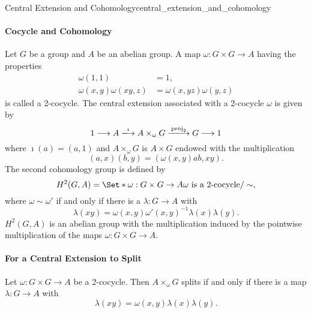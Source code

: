 \documentclass{article}
\begin{document}
\begin{example}{Central Extension and Cohomology}{central_extension_and_cohomology}
    \paragraph*{Cocycle and Cohomology}
    Let $G$ be a group and $A$ be an abelian group.
    A map $\omega: G\times G \rightarrow A$ having the properties
    \begin{align*}
        \omega(1,1) &= 1, \\
        \omega(x,y)\omega(xy,z) &= \omega(x,yz)\omega(y,z)
    \end{align*}
    is called a 2-cocycle.
    The central extension associated with a 2-cocycle $\omega$ is given by
    \[ 1 \longrightarrow A \xlongrightarrow{\imath} A \times_\omega G \xlongrightarrow{\operatorname{proj}_2} G \longrightarrow 1 \]
    where $\imath(a) = (a,1)$ and $A \times_\omega G$ is $A\times G$ endowed with the multiplication
    \[ (a,x)(b,y) = (\omega(x,y)ab, xy). \]
    The second cohomology group is defined by
    \[ H^2(G,A) = \Set*{\omega:G\times G \rightarrow A}{\omega \text{ is a 2-cocycle}}/\sim, \]
    where $\omega \sim \omega'$ if and only if there is a $\lambda:G\rightarrow A$ with
    \[ \lambda(xy) = \omega(x,y)\omega'(x,y)^{-1}\lambda(x)\lambda(y). \]
    $H^2(G,A)$ is an abelian group with the multiplication induced by the pointwise multiplication of the maps $\omega:G\times G \rightarrow A$.
    \paragraph*{For a Central Extension to Split}
    Let $\omega:G\times G\rightarrow A$ be a 2-cocycle.
    Then $A \times_\omega G$ splits if and only if there is a map $\lambda:G\rightarrow A$ with
    \[ \lambda(xy) = \omega(x,y)\lambda(x)\lambda(y). \]

\end{example}
\end{document}
